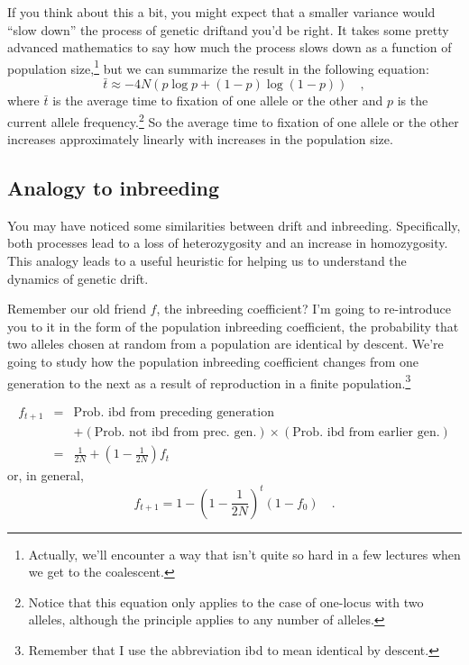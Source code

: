 If you think about this a bit, you might expect that a smaller
variance would ``slow down'' the process of genetic drift{\dash}and
you'd be right. It takes some pretty advanced mathematics to say how
much the process slows down as a function of population
size,\footnote{Actually, we'll encounter a way that isn't quite so
  hard in a few lectures when we get to the coalescent.} but we can
summarize the result in the following equation:
\[
\bar t \approx -4N\left(p\log p + (1-p)\log(1-p)\right) \quad ,
\]
where $\bar t$ is the average time to fixation of one allele or the
other and $p$ is the current allele frequency.\footnote{Notice that
  this equation only applies to the case of one-locus with two
  alleles, although the principle applies to any number of alleles.}
So the average time to fixation of one allele or the other increases
approximately linearly with increases in the population size.

\subsection*{Analogy to inbreeding}

You may have noticed some similarities between drift and
inbreeding. Specifically, both processes lead to a loss of
heterozygosity and an increase in homozygosity. This analogy leads to
a useful heuristic for helping us to understand the dynamics of
genetic drift.

Remember our old friend $f$, the inbreeding coefficient? I'm going to
re-introduce you to it in the form of the population inbreeding
coefficient, the probability that two alleles chosen at random from a
population are identical by descent. We're going to study how the
population inbreeding coefficient changes from one generation to the
next as a result of reproduction in a finite
population.\footnote{Remember that I use the abbreviation ibd to mean
identical by descent.}

\begin{eqnarray*}
f_{t+1} &=& \mbox{Prob. ibd from preceding generation} \\
        &&  + (\mbox{Prob. not ibd from prec. gen.}) \times (\mbox{Prob. ibd from
          earlier gen.}) \\
   &=& \frac{1}{2N} + \left(1 - \frac{1}{2N}\right)f_t
\end{eqnarray*}
or, in general,
\[
f_{t+1} = 1 - \left(1 - \frac{1}{2N}\right)^t(1-f_0) \quad .
\]

